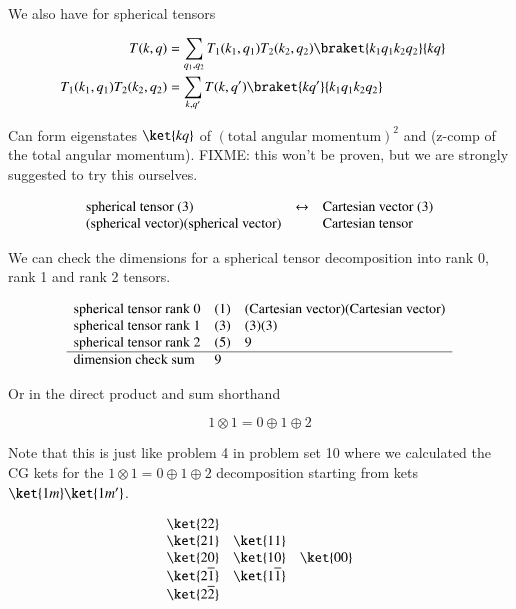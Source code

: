 We also have for spherical tensors

\begin{align*}
T(k, q) &= \sum_{q_1, q_2} 
T_1(k_1, q_1)
T_2(k_2, q_2)
\braket{ k_1 q_1 k_2 q_2 }{ k q}
	\\
T_1(k_1, q_1)
T_2(k_2, q_2)
&=
\sum_{k, q'}
T(k, q') \braket{ k q'}{ k_1 q_1 k_2 q_2 } &
\end{align*}

Can form eigenstates $\ket{kq}$ of $(\text{total angular momentum})^2$ and (z-comp of the total angular momentum).  
FIXME: this won't be proven, but we are strongly suggested to try this ourselves.

\begin{equation}\label{eqn:qmTwoL20:350}
\begin{array}{l l l}
\text{spherical tensor (3)} 				&\leftrightarrow &\text{Cartesian vector (3)} \\
(\text{spherical vector})(\text{spherical vector})	&		 &\text{Cartesian tensor}
\end{array}
\end{equation}

We can check the dimensions for a spherical tensor decomposition into rank 0, rank 1 and rank 2 tensors.

\begin{equation}\label{eqn:qmTwoL20:370}
\begin{array}{l l l}
\text{spherical tensor rank $0$} 	&	(1)	&	(\text{Cartesian vector})(\text{Cartesian vector}) \\
\text{spherical tensor rank $1$} 	&	(3)	&	(3)(3) \\
\text{spherical tensor rank $2$} 	&	(5)	&       9 \\
\hline
\text{dimension check sum}       	&	 9	&         \\
\end{array}
\end{equation}

Or in the direct product and sum shorthand

\begin{equation}\label{eqn:qmTwoL20:90}
1 \otimes 1 = 0 \oplus 1 \oplus 2
\end{equation}

Note that this is just like problem 4 in problem set 10 where we calculated the CG kets for the $1 \otimes 1 = 0 \oplus 1 \oplus 2$ decomposition starting from kets $\ket{1 m}\ket{1 m'}$.

\begin{equation}\label{eqn:qmTwoL20:390}
\begin{array}{l l l}
\ket{22}		&				& 		\\
\ket{21}		& \ket{11} 			& 		\\
\ket{20}		& \ket{10} 			& \ket{00} 	\\
\ket{2\overline{1}}	& \ket{1\overline{1}} 		& 		\\
\ket{2\overline{2}}	&				&
\end{array}
\end{equation}

